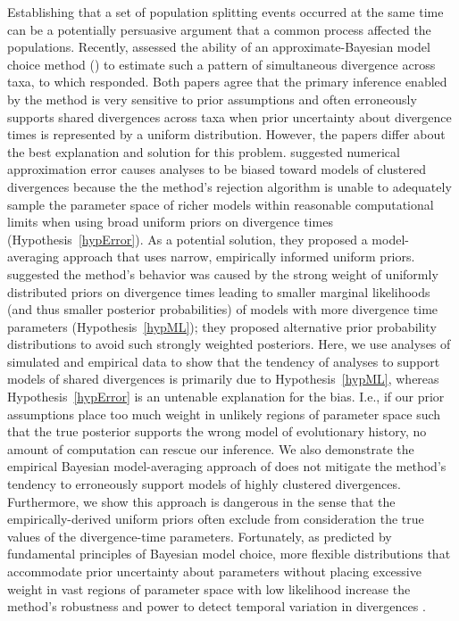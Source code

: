 Establishing that a set of population splitting events occurred at the same
time can be a potentially persuasive argument that a common process affected
the populations.
Recently, \citet{Oaks2012} assessed the ability of an approximate-Bayesian
model choice method (\msb) to estimate such a pattern of simultaneous
divergence across taxa, to which \citet{Hickerson2013} responded.
Both papers agree that the primary inference enabled by the method is very
sensitive to prior assumptions and often erroneously supports shared
divergences across taxa when prior uncertainty about divergence times
is represented by a uniform distribution.
However, the papers differ about the best explanation and solution for this
problem.
\citet{Hickerson2013} suggested numerical approximation error causes \msb
analyses to be biased toward models of clustered divergences because the the
method's rejection algorithm is unable to adequately sample the parameter space
of richer models within reasonable computational limits when using broad
uniform priors on divergence times (Hypothesis~\ref{hypError}).
As a potential solution, they proposed a model-averaging approach that uses
narrow, empirically informed uniform priors.
\citet{Oaks2012} suggested the method's behavior was caused by the strong
weight of uniformly distributed priors on divergence times leading to smaller
marginal likelihoods (and thus smaller posterior probabilities) of models with
more divergence time parameters (Hypothesis~\ref{hypML}); they proposed
alternative prior probability distributions to avoid such strongly weighted
posteriors.
Here, we use analyses of simulated and empirical data to show that the tendency
of \msb analyses to support models of shared divergences is primarily due to
Hypothesis~\ref{hypML}, whereas Hypothesis~\ref{hypError} is an untenable
explanation for the bias.
I.e., if our prior assumptions place too much weight in unlikely regions of
parameter space such that the true posterior supports the wrong model of
evolutionary history, no amount of computation can rescue our inference. 
We also demonstrate the empirical Bayesian model-averaging approach of
\citet{Hickerson2013} does not mitigate the method's tendency to erroneously
support models of highly clustered divergences.
Furthermore, we show this approach is dangerous in the sense that the
empirically-derived uniform priors often exclude from consideration the true
values of the divergence-time parameters.
Fortunately, as predicted by fundamental principles of Bayesian model choice,
more flexible distributions that accommodate prior uncertainty about parameters
without placing excessive weight in vast regions of parameter space with low
likelihood increase the method's robustness and power to detect temporal
variation in divergences \citep{Oaks2014dpp}.
